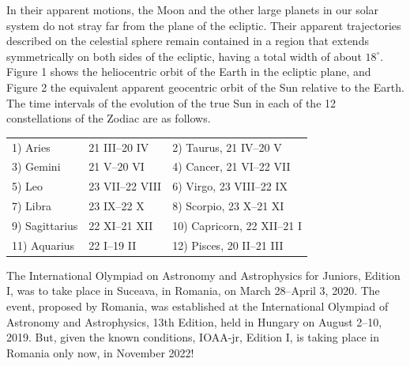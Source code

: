 In their apparent motions, the Moon and the other large planets in our solar
system do not stray far from the plane of the ecliptic. Their apparent
trajectories described on the celestial sphere remain contained in a region
that extends symmetrically on both sides of the ecliptic, having a total width
of about $18^\circ$. Figure 1 shows the heliocentric orbit of the Earth in
the ecliptic plane, and Figure 2 the equivalent apparent geocentric orbit of
the Sun relative to the Earth.
The time intervals of the evolution of the true Sun in each of the 12
constellations of the Zodiac are as follows.
\begin{center}
\begin{tabular}{lll}
1) Aries & 21 III--20 IV & 2) Taurus, 21 IV--20 V\\
3) Gemini & 21 V--20 VI & 4) Cancer, 21 VI--22 VII\\
5) Leo & 23 VII--22 VIII & 6) Virgo, 23 VIII--22 IX\\
7) Libra & 23 IX--22 X & 8) Scorpio, 23 X--21 XI\\
9) Sagittarius & 22 XI--21 XII & 10) Capricorn, 22 XII--21 I\\
11) Aquarius & 22 I--19 II & 12) Pisces, 20 II--21 III
\end{tabular}
\end{center}
The International Olympiad on Astronomy and Astrophysics for Juniors,
Edition I, was to take place in Suceava, in Romania, on March 28--April 3,
2020. The event, proposed by Romania, was established at the International
Olympiad of Astronomy and Astrophysics, 13th Edition, held in Hungary on
August 2--10, 2019. But, given the known conditions, IOAA-jr, Edition I, is
taking place in Romania only now, in November 2022!

